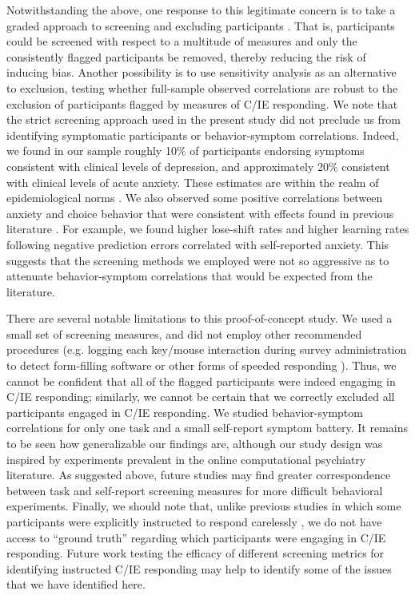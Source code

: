 \documentclass[a4paper,notitlepage,12pt]{article}
\begin{document}
\begin{refsection}[main]
Notwithstanding the above, one response to this legitimate concern is to take a graded approach to screening and excluding participants \cite{Kim2018-ev}. That is, participants could be screened with respect to a multitude of measures and only the consistently flagged participants be removed, thereby reducing the risk of inducing bias. Another possibility is to use sensitivity analysis as an alternative to exclusion, testing whether full-sample observed correlations are robust to the exclusion of participants flagged by measures of C/IE responding. We note that the strict screening approach used in the present study did not preclude us from identifying symptomatic participants or behavior-symptom correlations. Indeed, we found in our sample roughly 10\% of participants endorsing symptoms consistent with clinical levels of depression, and approximately 20\% consistent with clinical levels of acute anxiety. These estimates are within the realm of epidemiological norms \cite{kessler2012twelve, lowe2008validation, yarrington2021impact}. We also observed some positive correlations between anxiety and choice behavior that were consistent with effects found in previous literature \cite{huang2017computational, harle2017anhedonia, garrett2018updating}. For example, we found higher lose-shift rates and higher learning rates following negative prediction errors correlated with self-reported anxiety. This suggests that the screening methods we employed were not so aggressive as to attenuate behavior-symptom correlations that would be expected from the literature. 

There are several notable limitations to this proof-of-concept study. We used a small set of screening measures, and did not employ other recommended procedures (e.g. logging each key/mouse interaction during survey administration to detect form-filling software or other forms of speeded responding \cite{buchanan2018methods}). Thus, we cannot be confident that all of the flagged participants were indeed engaging in C/IE responding; similarly, we cannot be certain that we correctly excluded all participants engaged in C/IE responding. We studied behavior-symptom correlations for only one task and a small self-report symptom battery. It remains to be seen how generalizable our findings are, although our study design was inspired by experiments prevalent in the online computational psychiatry literature. As suggested above, future studies may find greater correspondence between task and self-report screening measures for more difficult behavioral experiments. Finally, we should note that, unlike previous studies in which some participants were explicitly instructed to respond carelessly \cite{buchanan2018methods}, we do not have access to ``ground truth'' regarding which participants were engaging in C/IE responding. Future work testing the efficacy of different screening metrics for identifying instructed C/IE responding may help to identify some of the issues that we have identified here.


\end{refsection}
\end{document}
